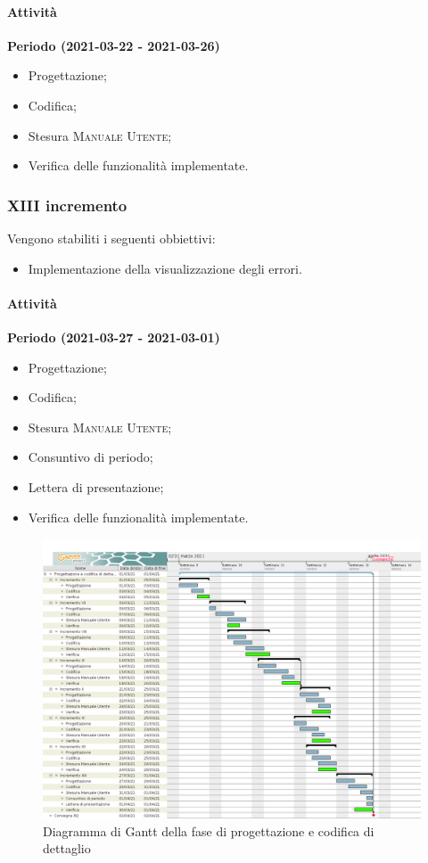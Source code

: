 \documentclass[../piano_di_progetto.tex]{subfiles}
\begin{document}
\paragraph{Attività}
\noindent\textbf{Periodo (2021-03-22 - 2021-03-26)}
\begin{itemize}
    \item Progettazione;
    \item Codifica;
    \item Stesura \textsc{Manuale Utente};
    \item Verifica delle funzionalità implementate.
\end{itemize}


\subsubsection{XIII incremento}
Vengono stabiliti i seguenti obbiettivi:
\begin{itemize}
    \item Implementazione della visualizzazione degli errori.
\end{itemize}
\paragraph{Attività}
\noindent\textbf{Periodo (2021-03-27 - 2021-03-01)}
\begin{itemize}
    \item Progettazione;
    \item Codifica;
    \item Stesura \textsc{Manuale Utente};
    \item Consuntivo di periodo;
    \item Lettera di presentazione;
    \item Verifica delle funzionalità implementate.
\end{itemize}


\begin{figure}[H]
\centering
\includegraphics[width=18cm]{src/img/gantt/03_RQ.png}
\caption{Diagramma di Gantt della fase di progettazione e codifica di dettaglio}
\end{figure}
\end{document}
